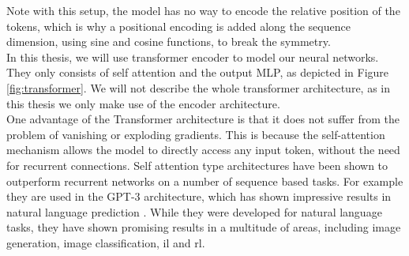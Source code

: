 Note with this setup, the model has no way to encode the relative position of the tokens, which is why a positional encoding is added along the sequence dimension, 
using sine and cosine functions, to break the symmetry.\\ 
In this thesis, we will use transformer encoder to model our neural networks. They only consists of self attention and the output MLP, as depicted in Figure \ref{fig:transformer}. 
We will not describe the whole transformer architecture, 
as in this thesis we only make use of the encoder architecture.\\
One advantage of the Transformer architecture is that it does not suffer from the problem of vanishing or exploding gradients.
This is because the self-attention mechanism allows the model to directly access any input token, without the need for recurrent connections. Self attention type 
architectures have been shown to outperform recurrent networks on a number of sequence based tasks. For example they are used in the GPT-3 architecture, which has 
shown impressive results in natural language prediction \cite{brown2020language}. While they were developed for natural language tasks, they have 
shown promising results in a multitude of areas, including image generation, image classification, \ac{il} and \ac{rl}.